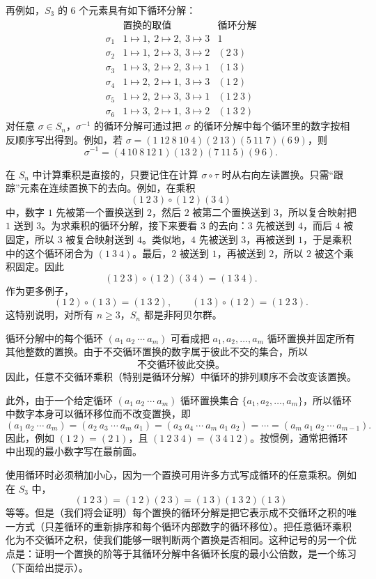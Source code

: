 再例如，$S_3$ 的 $6$ 个元素具有如下循环分解：
\[
\begin{array}{c|c|c}
 & \text{置换的取值} & \text{循环分解}\\ \hline
\sigma_1&1\mapsto1,\ 2\mapsto2,\ 3\mapsto3&1\\
\sigma_2&1\mapsto1,\ 2\mapsto3,\ 3\mapsto2&(2\ 3)\\
\sigma_3&1\mapsto3,\ 2\mapsto2,\ 3\mapsto1&(1\ 3)\\
\sigma_4&1\mapsto2,\ 2\mapsto1,\ 3\mapsto3&(1\ 2)\\
\sigma_5&1\mapsto2,\ 2\mapsto3,\ 3\mapsto1&(1\ 2\ 3)\\
\sigma_6&1\mapsto3,\ 2\mapsto1,\ 3\mapsto2&(1\ 3\ 2)
\end{array}
\]
对任意 $\sigma\in S_n$，$\sigma^{-1}$ 的循环分解可通过把 $\sigma$ 的循环分解中每个循环里的数字按相反顺序写出得到。例如，若 $\sigma=(1\ 12\ 8\ 10\ 4)(2\ 13)(5\ 11\ 7)(6\ 9)$，则
\[
  \sigma^{-1}=(4\ 10\ 8\ 12\ 1)(13\ 2)(7\ 11\ 5)(9\ 6).
\]

在 $S_n$ 中计算乘积是直接的，只要记住在计算 $\sigma\circ\tau$ 时从右向左读置换。只需“跟踪”元素在连续置换下的去向。例如，在乘积
\[
  (1\ 2\ 3)\circ(1\ 2)(3\ 4)
\]
中，数字 $1$ 先被第一个置换送到 $2$，然后 $2$ 被第二个置换送到 $3$，所以复合映射把 $1$ 送到 $3$。为求乘积的循环分解，接下来要看 $3$ 的去向：$3$ 先被送到 $4$，而后 $4$ 被固定，所以 $3$ 被复合映射送到 $4$。类似地，$4$ 先被送到 $3$，再被送到 $1$，于是乘积中的这个循环闭合为 $(1\ 3\ 4)$。最后，$2$ 被送到 $1$，再被送到 $2$，所以 $2$ 被这个乘积固定。因此
\[
  (1\ 2\ 3)\circ(1\ 2)(3\ 4)=(1\ 3\ 4).
\]
作为更多例子，
\[
  (1\ 2)\circ(1\ 3)=(1\ 3\ 2),\qquad (1\ 3)\circ(1\ 2)=(1\ 2\ 3).
\]
这特别说明，对所有 $n\geq3$，$S_n$ 都是非阿贝尔群。

循环分解中的每个循环 $(a_1\ a_2\ \cdots\ a_m)$ 可看成把 $a_1,a_2,\ldots,a_m$ 循环置换并固定所有其他整数的置换。由于不交循环置换的数字属于彼此不交的集合，所以
\[
  \text{不交循环彼此交换。}
\]
因此，任意不交循环乘积（特别是循环分解）中循环的排列顺序不会改变该置换。

此外，由于一个给定循环 $(a_1\ a_2\ \cdots\ a_m)$ 循环置换集合 $\{a_1,a_2,\ldots,a_m\}$，所以循环中数字本身可以循环移位而不改变置换，即
\[
  (a_1\ a_2\ \cdots\ a_m)=(a_2\ a_3\ \cdots\ a_m\ a_1)=(a_3\ a_4\ \cdots\ a_m\ a_1\ a_2)=\cdots=(a_m\ a_1\ a_2\ \cdots\ a_{m-1}).
\]
因此，例如 $(1\ 2)=(2\ 1)$，且 $(1\ 2\ 3\ 4)=(3\ 4\ 1\ 2)$。按惯例，通常把循环中出现的最小数字写在最前面。

使用循环时必须稍加小心，因为一个置换可用许多方式写成循环的任意乘积。例如在 $S_3$ 中，
\[
  (1\ 2\ 3)=(1\ 2)(2\ 3)=(1\ 3)(1\ 3\ 2)(1\ 3)
\]
等等。但是（我们将会证明）每个置换的循环分解是把它表示成不交循环之积的唯一方式（只差循环的重新排序和每个循环内部数字的循环移位）。把任意循环乘积化为不交循环之积，使我们能够一眼判断两个置换是否相同。这种记号的另一个优点是：证明一个置换的阶等于其循环分解中各循环长度的最小公倍数，是一个练习（下面给出提示）。


